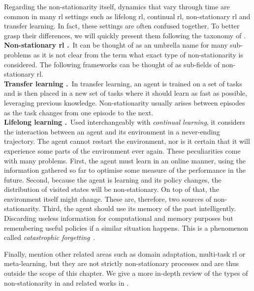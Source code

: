 Regarding the non-stationarity itself, dynamics that vary through time are common in many \gls{rl} settings such as lifelong \gls{rl}, continual \gls{rl}, non-stationary \gls{rl} and transfer learning. 
In fact, these settings are often confused together. 
To better grasp their differences, we will quickly present them following the taxonomy of \cite{khetarpal2020towards}. 
\\
\noindent\textbf{Non-stationary \gls{rl} \cite{bowerman1974nonstationary}.}~\indent It can be thought of as an umbrella name for many sub-problems as it is not clear from the term what exact type of non-stationarity is considered.
The following frameworks can be thought of as sub-fields of non-stationary \gls{rl}.
\\
\noindent\textbf{Transfer learning \cite{taylor2009transfer}.}~\indent In transfer learning, an agent is trained on a set of tasks and is then placed in a new set of tasks where it should learn as fast as possible, leveraging previous knowledge.
Non-stationarity usually arises between episodes as the task changes from one episode to the next.
\\ 
\noindent\textbf{Lifelong learning \cite{chen2018lifelong}.}~\indent Used interchangeably with \emph{continual learning}, it considers the interaction between an agent and its environment in a never-ending trajectory. 
The agent cannot restart the environment, nor is it certain that it will experience some parts of the environment ever again. 
These peculiarities come with many problems.
First, the agent must learn in an online manner, using the information gathered so far to optimise some measure of the performance in the future. 
Second, because the agent is learning and its policy changes, the distribution of visited states will be non-stationary. 
On top of that, the environment itself might change. 
These are, therefore, two sources of non-stationarity.
Third, the agent should use its memory of the past intelligently. 
Discarding useless information for computational and memory purposes but remembering useful policies if a similar situation happens. 
This is a phenomenon called \emph{catastrophic forgetting}~\cite{mccloskey1989catastrophic,french1999catastrophic}.

Finally, \cite{khetarpal2020towards} mention other related areas such as domain adaptation, multi-task \gls{rl} or meta-learning, but they are not strictly non-stationary processes and are thus outside the scope of this chapter. 
We give a more in-depth review of the types of non-stationarity in  and related works in .




